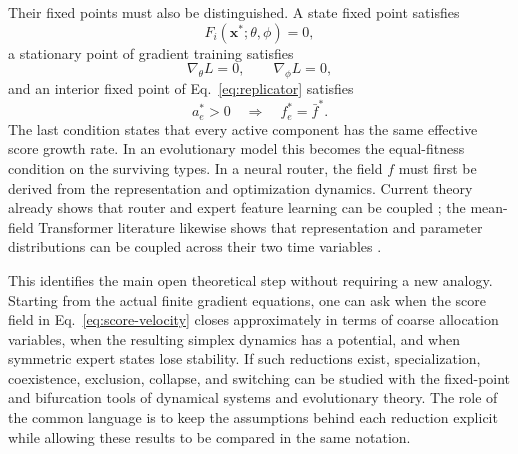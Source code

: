 \documentclass[11pt]{article}
\begin{document}
Their fixed points must also be distinguished. A state fixed point satisfies
\begin{equation}
F_i(\mathbf x^*;\theta,\phi)=0,
\end{equation}
a stationary point of gradient training satisfies
\begin{equation}
\nabla_\theta L=0,
\qquad
\nabla_\phi L=0,
\end{equation}
and an interior fixed point of Eq.~\eqref{eq:replicator} satisfies
\begin{equation}
a_e^*>0
\quad\Longrightarrow\quad
f_e^*=\bar f^*.
\end{equation}
The last condition states that every active component has the same effective score growth rate. In an evolutionary model this becomes the equal-fitness condition on the surviving types. In a neural router, the field $f$ must first be derived from the representation and optimization dynamics. Current theory already shows that router and expert feature learning can be coupled \cite{liao2026}; the mean-field Transformer literature likewise shows that representation and parameter distributions can be coupled across their two time variables \cite{herty2026}.

This identifies the main open theoretical step without requiring a new analogy. Starting from the actual finite gradient equations, one can ask when the score field in Eq.~\eqref{eq:score-velocity} closes approximately in terms of coarse allocation variables, when the resulting simplex dynamics has a potential, and when symmetric expert states lose stability. If such reductions exist, specialization, coexistence, exclusion, collapse, and switching can be studied with the fixed-point and bifurcation tools of dynamical systems and evolutionary theory. The role of the common language is to keep the assumptions behind each reduction explicit while allowing these results to be compared in the same notation.
\end{document}
